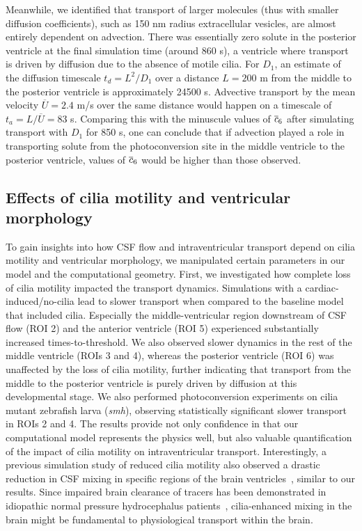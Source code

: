 \documentclass{WileyMSP-template}
\begin{document}
Meanwhile, we identified that transport of larger molecules
(thus with smaller diffusion coefficients),
such as 150 nm radius extracellular vesicles, are almost entirely dependent on advection.
There was essentially zero solute in the posterior ventricle at the
final simulation time (around 860 s), a ventricle where transport is driven
by diffusion due to the absence of motile cilia.
For $D_1$, an estimate of the diffusion timescale $t_d=L^2/D_1$ over a distance
$L=200$ \textmu m from the middle to the posterior ventricle is approximately 24500 s.
Advective transport by the mean velocity $\overline{U}=2.4$ \textmu m/s over the same
distance would happen on a timescale of $t_a=L/\overline{U}=83$ s.
Comparing this with the minuscule values of $\overline{c}_6$ after simulating transport
with $D_1$ for 850 s, one can conclude that if advection
played a role in transporting solute from the photoconversion site in the middle ventricle
to the posterior ventricle, values of $\overline{c}_6$ would be higher than those observed.

\subsection{Effects of cilia motility and ventricular morphology}
To gain insights into how CSF flow and intraventricular transport depend on cilia
motility and ventricular morphology, we manipulated certain
parameters in our model and the computational geometry.
First, we investigated how complete loss of cilia motility
impacted the transport dynamics. Simulations with a cardiac-induced/no-cilia lead to
slower transport when compared to the baseline model that included cilia. Especially
the middle-ventricular region downstream of CSF flow (ROI 2) and the anterior ventricle (ROI 5)
experienced substantially increased times-to-threshold. We also observed
slower dynamics in the rest of the middle ventricle (ROIs 3 and 4), whereas the
posterior ventricle (ROI 6) was unaffected by the loss of cilia motility,
further indicating that transport from the middle to the posterior ventricle is
purely driven by diffusion at this developmental stage.
We also performed photoconversion experiments on cilia mutant
zebrafish larva (\emph{smh}), observing statistically significant slower transport in 
ROIs 2 and 4. The results provide not only confidence in that our computational model
represents the physics well, but also valuable quantification of the impact of cilia motility
on intraventricular transport. Interestingly, a previous simulation study of reduced cilia motility
also observed a drastic reduction in CSF mixing in specific regions of the brain
ventricles~\cite{Yoshida2022EffectVentricles}, similar to our results. Since impaired brain 
clearance of tracers has been demonstrated in idiopathic normal pressure hydrocephalus
patients~\cite{Eide2020MagneticHydrocephalus}, cilia-enhanced mixing in the brain might be
fundamental to physiological transport within the brain.
\end{document}
